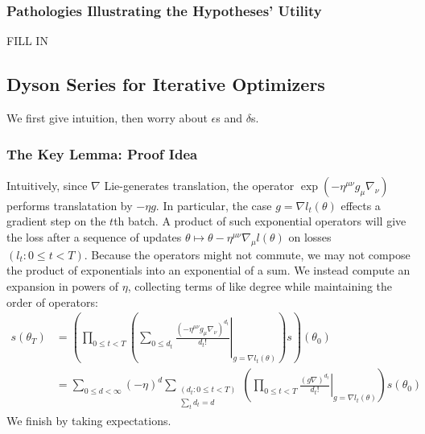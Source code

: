 \documentclass{article}
\newcommand{\wrap}[1]{\left(#1\right)}
\begin{document}
        \subsubsection*{Pathologies Illustrating the Hypotheses' Utility}
            {\color{moor} FILL IN}


    \subsection{Dyson Series for Iterative Optimizers}
        We first give intuition, then worry about $\epsilon$s and $\delta$s.
        \subsubsection*{The Key Lemma: Proof Idea}
            Intuitively, since $\nabla$ Lie-generates translation, the operator
            $
                \exp\wrap{
                    -\eta^{\mu\nu} g_\mu \nabla_\nu
                }
            $
            performs translatation by $-\eta g$.  In particular, the case
            $g=\nabla l_t(\theta)$ effects a gradient step on the $t$th batch.
            A product of such exponential operators will give the loss after a
            sequence of updates $\theta \mapsto \theta - \eta^{\mu\nu}
            \nabla_\mu l(\theta)$ on losses $(l_t: 0\leq t < T)$.  Because the
            operators might not commute, we may not compose the product of
            exponentials into an exponential of a sum.  We instead compute an
            expansion in powers of $\eta$, collecting terms of like degree
            while maintaining the order of operators:
            \begin{align*}
                s(\theta_T)
                &=
                \wrap{\prod_{0\leq t<T} \wrap{
                    \sum_{0\leq d_t}
                        \left.
                            \frac{(-\eta^{\mu\nu} g_\mu \nabla_\nu)^{d_t}}{d_t!}
                        \right|_{g=\nabla l_t(\theta)}
                }
                s} (\theta_0) \\
                &= 
                \sum_{0\leq d < \infty} (-\eta)^d
                \sum_{\substack{(d_t: 0\leq t<T) \\ \sum_t d_t = d}}
                \wrap{
                    \prod_{0 \leq t < T} \left.
                        \frac{(g \nabla)^{d_t}}{d_t!}
                    \right|_{g=\nabla l_t(\theta)}
                } s (\theta_0)
            \end{align*}
            We finish by taking expectations.
\end{document}
